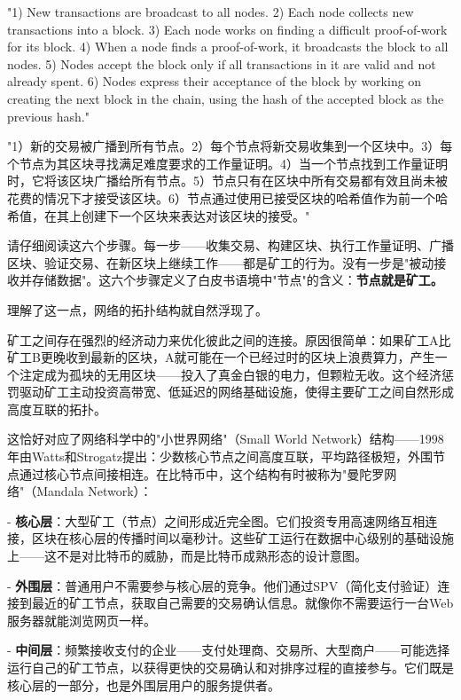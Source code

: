 \documentclass[a4paper,12pt,openany]{ctexbook}
\newenvironment{quoting}{%
  \par\vspace{0.5em}%
  \begin{list}{}{%
    \setlength{\leftmargin}{2em}%
    \setlength{\rightmargin}{2em}%
    \setlength{\parsep}{0.3em}%
    \setlength{\itemsep}{0pt}%
    \setlength{\topsep}{0pt}%
  }%
  \item\relax
}{%
  \end{list}%
  \par\vspace{0.5em}%
}
\begin{document}
\begin{quoting}
\small
"1) New transactions are broadcast to all nodes. 2) Each node collects new transactions into a block. 3) Each node works on finding a difficult proof-of-work for its block. 4) When a node finds a proof-of-work, it broadcasts the block to all nodes. 5) Nodes accept the block only if all transactions in it are valid and not already spent. 6) Nodes express their acceptance of the block by working on creating the next block in the chain, using the hash of the accepted block as the previous hash."

"1）新的交易被广播到所有节点。2）每个节点将新交易收集到一个区块中。3）每个节点为其区块寻找满足难度要求的工作量证明。4）当一个节点找到工作量证明时，它将该区块广播给所有节点。5）节点只有在区块中所有交易都有效且尚未被花费的情况下才接受该区块。6）节点通过使用已接受区块的哈希值作为前一个哈希值，在其上创建下一个区块来表达对该区块的接受。"
\end{quoting}


请仔细阅读这六个步骤。每一步——收集交易、构建区块、执行工作量证明、广播区块、验证交易、在新区块上继续工作——都是矿工的行为。没有一步是"被动接收并存储数据"。这六个步骤定义了白皮书语境中"节点"的含义：\textbf{节点就是矿工。}

理解了这一点，网络的拓扑结构就自然浮现了。

矿工之间存在强烈的经济动力来优化彼此之间的连接。原因很简单：如果矿工A比矿工B更晚收到最新的区块，A就可能在一个已经过时的区块上浪费算力，产生一个注定成为孤块的无用区块——投入了真金白银的电力，但颗粒无收。这个经济惩罚驱动矿工主动投资高带宽、低延迟的网络基础设施，使得主要矿工之间自然形成高度互联的拓扑。

这恰好对应了网络科学中的"小世界网络"（Small World Network）结构——1998年由Watts和Strogatz提出：少数核心节点之间高度互联，平均路径极短，外围节点通过核心节点间接相连。在比特币中，这个结构有时被称为"曼陀罗网络"（Mandala Network）：

- \textbf{核心层}：大型矿工（节点）之间形成近完全图。它们投资专用高速网络互相连接，区块在核心层的传播时间以毫秒计。这些矿工运行在数据中心级别的基础设施上——这不是对比特币的威胁，而是比特币成熟形态的设计意图。

- \textbf{外围层}：普通用户不需要参与核心层的竞争。他们通过SPV（简化支付验证）连接到最近的矿工节点，获取自己需要的交易确认信息。就像你不需要运行一台Web服务器就能浏览网页一样。

- \textbf{中间层}：频繁接收支付的企业——支付处理商、交易所、大型商户——可能选择运行自己的矿工节点，以获得更快的交易确认和对排序过程的直接参与。它们既是核心层的一部分，也是外围层用户的服务提供者。
\end{document}
